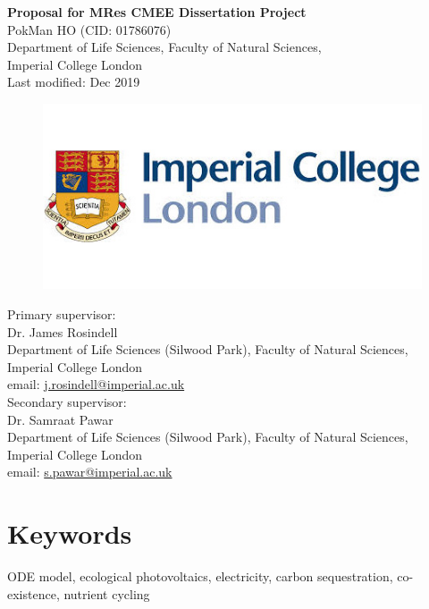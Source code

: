 \documentclass[a4paper, 11pt]{article}
\title{\ReportTitle}
\author{\ReportAuthor}
\date{}
\newcommand{\ReportTitle}{Proposal for MRes CMEE Dissertation Project}
\newcommand{\ReportAuthor}{PokMan HO (CID: 01786076)}
\newcommand{\ReportAffil}{Department of Life Sciences, Faculty of Natural Sciences,\\Imperial College London}
\begin{document}
	\begin{center}
		\Huge\textbf{\ReportTitle}\\
		\LARGE\ReportAuthor\\
		\Large\ReportAffil\\
		\Large{Last modified: Dec 2019}
	\end{center}
	\begin{figure}[h]
		\centering\includegraphics[width=\linewidth]{icl.jpg}
	\end{figure}
Primary supervisor:\\
\indent Dr. James Rosindell\\
\indent Department of Life Sciences (Silwood Park), Faculty of Natural Sciences, Imperial College London\\
\indent email: \href{mailto:j.rosindell@imperial.ac.uk}{j.rosindell@imperial.ac.uk}\\
Secondary supervisor:\\
\indent Dr. Samraat Pawar\\
\indent Department of Life Sciences (Silwood Park), Faculty of Natural Sciences, Imperial College London\\
\indent email: \href{mailto:s.pawar@imperial.ac.uk}{s.pawar@imperial.ac.uk}
\clearpage
\section{Keywords}
ODE model, ecological photovoltaics, electricity, carbon sequestration, co-existence, nutrient cycling
\end{document}

